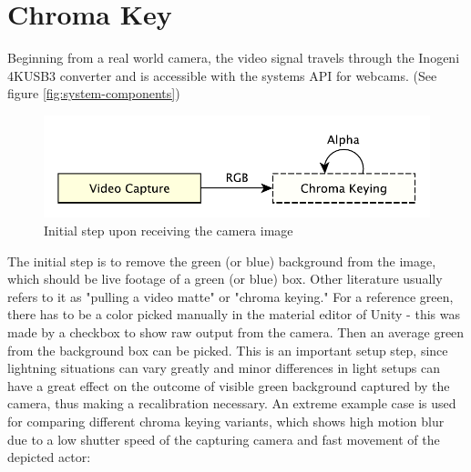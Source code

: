 %
\section{Chroma Key}
\label{sec:chromakey}

Beginning from a real world camera, the video signal travels through the 
Inogeni 4KUSB3 converter and is accessible with the systems API for webcams. 
(See figure \ref{fig:system-components})

\begin{figure}[htb]
	\includegraphics[width=\textwidth]{_raw_resources/pipeline_steps/4_1_chroma.pdf}
	\caption{Initial step upon receiving the camera image}
	\label{fig:steps:chroma}
\end{figure}

The initial step is to remove the green (or blue) background from the image, 
which should be live footage of a green (or blue) box. Other literature usually 
refers to it as "pulling a video matte" or "chroma keying." For a reference 
green, there has to be a color picked manually in the material editor of Unity 
- this was made by a checkbox to show raw output from the camera.  Then an average green from the background box can be 
picked. This is an important setup step, since lightning situations can vary 
greatly and minor differences in light setups can have a great effect on the 
outcome of visible green background captured by the camera, thus making a 
recalibration necessary.
\newline
An extreme example case is used for comparing different chroma keying variants, 
which shows high motion blur due to a low shutter speed of the capturing 
camera and fast movement of the depicted actor:

